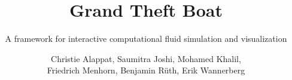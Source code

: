 \documentclass[11pt,a4paper]{scrartcl}
\begin{document}

\title{Grand Theft Boat}
\subtitle{A framework for interactive computational fluid simulation and
visualization}
\author{Christie Alappat, Saumitra Joshi, Mohamed Khalil, \\ Friedrich Menhorn, Benjamin Rüth, Erik Wannerberg}

\maketitle

\tableofcontents

\listoftodos























\clearpage
\newpage


\end{document}
